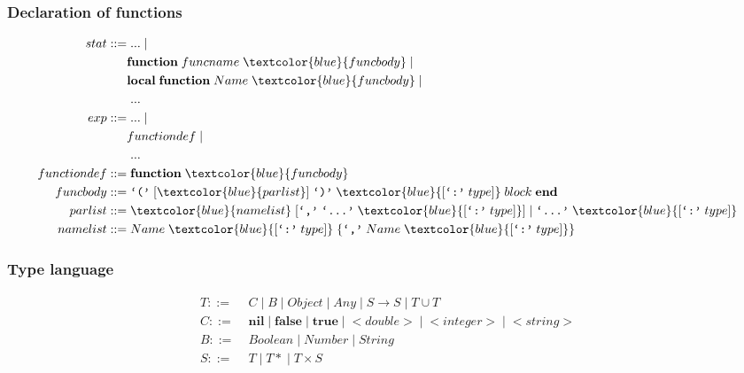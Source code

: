 \documentclass{beamer}
\newcommand{\pipe}{|\;}
\begin{document}
\begin{frame}
\frametitle{Declaration of functions}
\begin{align*}
stat ::= & \; ... \; |\\
& \textbf{function} \; funcname \; \textcolor{blue}{funcbody} \; |\\
& \textbf{local} \; \textbf{function} \; Name \; \textcolor{blue}{funcbody} \; |\\
& \; ... \\
exp ::= & \; ... \; |\\
& functiondef \; |\\
& \; ...\\
functiondef ::= & \; \textbf{function} \; \textcolor{blue}{funcbody}\\
funcbody ::= & \; \texttt{`('} \; [\textcolor{blue}{parlist}] \; \texttt{`)'} \;
\textcolor{blue}{[\texttt{`:'} \; type]} \; block \; \textbf{end}\\
parlist ::= & \; \textcolor{blue}{namelist} \; [\texttt{`,'} \; \texttt{`...'} \;
\textcolor{blue}{[\texttt{`:'} \; type]}] \; | \;
\texttt{`...'} \; \textcolor{blue}{[\texttt{`:'} \; type]}\\
namelist ::= & \; Name \; \textcolor{blue}{[\texttt{`:'} \; type]} \;
\{\texttt{`,'} \; Name \; \textcolor{blue}{[\texttt{`:'} \; type]}\}
\end{align*}
\end{frame}

\begin{frame}
\frametitle{Type language}
\begin{align*}
T ::= \; & C \; \pipe B \; \pipe Object \; \pipe Any \; \pipe
S \rightarrow S \; \pipe T \cup T\\
C ::= \; & \mathbf{nil} \; \pipe \mathbf{false} \; \pipe \mathbf{true} \;
\pipe {<}double{>} \; \pipe {<}integer{>} \; \pipe {<}string{>}\\
B ::= \; & Boolean \; \pipe Number \; \pipe String\\
S ::= \; & T \; \pipe {T*} \; \pipe T \times S\\ 
\end{align*}
\end{frame}
\end{document}
